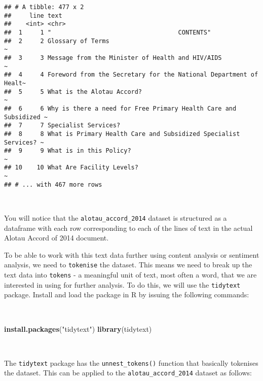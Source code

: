 \documentclass[11pt,a4paper]{article}
\newenvironment{Shaded}{\begin{snugshade}}{\end{snugshade}}
\newcommand{\KeywordTok}[1]{\textcolor[rgb]{0.13,0.29,0.53}{\textbf{#1}}}
\newcommand{\StringTok}[1]{\textcolor[rgb]{0.31,0.60,0.02}{#1}}
\newcommand{\NormalTok}[1]{#1}
\begin{document}
\begin{verbatim}
## # A tibble: 477 x 2
##     line text                                                             
##    <int> <chr>                                                            
##  1     1 "                                   CONTENTS"                    
##  2     2 Glossary of Terms                                               ~
##  3     3 Message from the Minister of Health and HIV/AIDS                ~
##  4     4 Foreword from the Secretary for the National Department of Healt~
##  5     5 What is the Alotau Accord?                                      ~
##  6     6 Why is there a need for Free Primary Health Care and Subsidized ~
##  7     7 Specialist Services?                                             
##  8     8 What is Primary Health Care and Subsidized Specialist Services? ~
##  9     9 What is in this Policy?                                         ~
## 10    10 What Are Facility Levels?                                       ~
## # ... with 467 more rows
\end{verbatim}

~

You will notice that the \texttt{alotau\_accord\_2014} dataset is
structured as a dataframe with each row corresponding to each of the
lines of text in the actual Alotau Accord of 2014 document.

To be able to work with this text data further using content analysis or
sentiment analysis, we need to \texttt{tokenise} the dataset. This means
we need to break up the text data into \texttt{tokens} - a meaningful
unit of text, most often a word, that we are interested in using for
further analysis. To do this, we will use the \texttt{tidytext} package.
Install and load the package in R by issuing the following commands:

~

\begin{Shaded}
\begin{Highlighting}[]
\KeywordTok{install.packages}\NormalTok{(}\StringTok{"tidytext"}\NormalTok{)}
\KeywordTok{library}\NormalTok{(tidytext)}
\end{Highlighting}
\end{Shaded}

~

The \texttt{tidytext} package has the \texttt{unnest\_tokens()} function
that basically tokenises the dataset. This can be applied to the
\texttt{alotau\_accord\_2014} dataset as follows:

~
\end{document}
